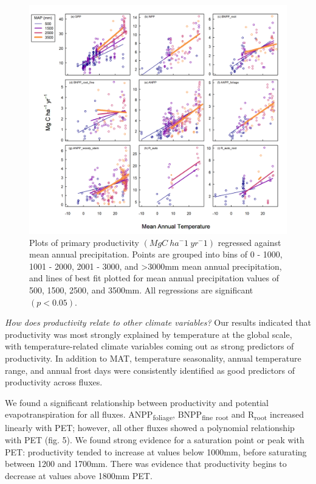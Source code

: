 \documentclass[]{article}
\begin{document}
\begin{figure}[H]
\includegraphics[width=1\linewidth]{mat_map_interaction} \caption{Plots of primary productivity $(MgC~ha^-1~yr^-1)$ regressed against mean annual precipitation. Points are grouped into bins of 0 - 1000, 1001 - 2000, 2001 - 3000, and >3000mm mean annual precipitation, and lines of best fit plotted for mean annual precipitation values of 500, 1500, 2500, and 3500mm. All regressions are significant $(p<0.05)$.}\label{fig:unnamed-chunk-8}
\end{figure}

\emph{How does productivity relate to other climate variables?} Our
results indicated that productivity was most strongly explained by
temperature at the global scale, with temperature-related climate
variables coming out as strong predictors of productivity. In addition
to MAT, temperature seasonality, annual temperature range, and annual
frost days were consistently identified as good predictors of
productivity across fluxes.

We found a significant relationship between productivity and potential
evapotranspiration for all fluxes. ANPP\textsubscript{foliage},
BNPP\textsubscript{fine} \textsubscript{root} and R\textsubscript{root}
increased linearly with PET; however, all other fluxes showed a
polynomial relationship with PET (fig. 5). We found strong evidence for
a saturation point or peak with PET: productivity tended to increase at
values below 1000mm, before saturating between 1200 and 1700mm. There
was evidence that productivity begins to decrease at values above 1800mm
PET.
\end{document}
